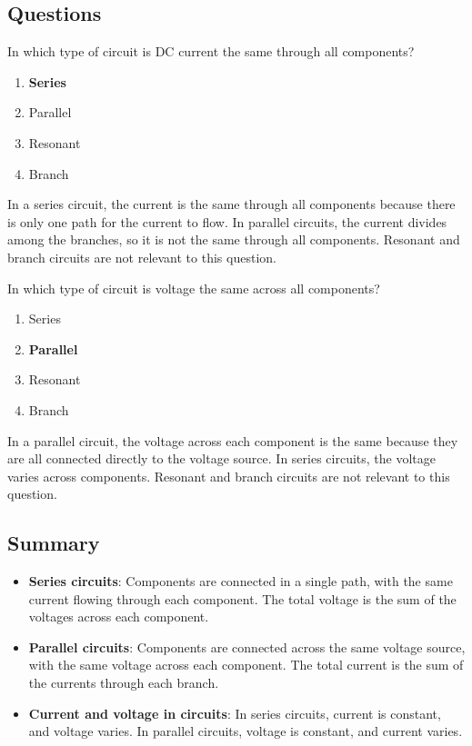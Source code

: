 \subsection*{Questions}
\begin{tcolorbox}[colback=gray!10!white,colframe=black!75!black,title={T5D13}]
    In which type of circuit is DC current the same through all components?
    \begin{enumerate}[label=\Alph*),noitemsep]
        \item \textbf{Series}
        \item Parallel
        \item Resonant
        \item Branch
    \end{enumerate}
\end{tcolorbox}
In a series circuit, the current is the same through all components because there is only one path for the current to flow. In parallel circuits, the current divides among the branches, so it is not the same through all components. Resonant and branch circuits are not relevant to this question.


\begin{tcolorbox}[colback=gray!10!white,colframe=black!75!black,title={T5D14}]
    In which type of circuit is voltage the same across all components?
    \begin{enumerate}[label=\Alph*),noitemsep]
        \item Series
        \item \textbf{Parallel}
        \item Resonant
        \item Branch
    \end{enumerate}
\end{tcolorbox}
In a parallel circuit, the voltage across each component is the same because they are all connected directly to the voltage source. In series circuits, the voltage varies across components. Resonant and branch circuits are not relevant to this question.


\subsection*{Summary}
\begin{itemize}
    \item \textbf{Series circuits}: Components are connected in a single path, with the same current flowing through each component. The total voltage is the sum of the voltages across each component.
    \item \textbf{Parallel circuits}: Components are connected across the same voltage source, with the same voltage across each component. The total current is the sum of the currents through each branch.
    \item \textbf{Current and voltage in circuits}: In series circuits, current is constant, and voltage varies. In parallel circuits, voltage is constant, and current varies.
\end{itemize}
